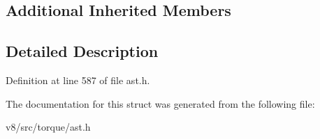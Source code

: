 \subsection*{Additional Inherited Members}


\subsection{Detailed Description}


Definition at line 587 of file ast.\+h.



The documentation for this struct was generated from the following file\+:\begin{DoxyCompactItemize}
\item 
v8/src/torque/ast.\+h\end{DoxyCompactItemize}
